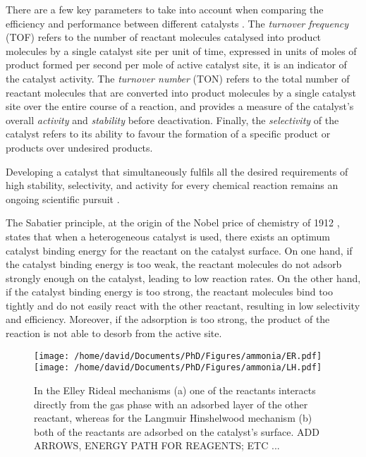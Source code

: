 There are a few key parameters to take into account when comparing the efficiency and performance between different catalysts \parencite{Boudart1995, ZHANG2019, WACHS2022}.
The \textit{turnover frequency} (TOF) refers to the number of reactant molecules catalysed into product molecules by a single catalyst site per unit of time, expressed in units of moles of product formed per second per mole of active catalyst site, it is an indicator of the catalyst activity.
The \textit{turnover number} (TON) refers to the total number of reactant molecules that are converted into product molecules by a single catalyst site over the entire course of a reaction, and provides a measure of the catalyst's overall \textit{activity} and \textit{stability} before deactivation.
Finally, the \textit{selectivity} of the catalyst refers to its ability to favour the formation of a specific product or products over undesired products.

Developing a catalyst that simultaneously fulfils all the desired requirements of high stability, selectivity, and activity for every chemical reaction remains an ongoing scientific pursuit \parencite{Hagen2016}.

The Sabatier principle, at the origin of the Nobel price of chemistry of 1912 \parencite{Che2013}, states that when a heterogeneous catalyst is used, there exists an optimum catalyst binding energy for the reactant on the catalyst surface.
On one hand, if the catalyst binding energy is too weak, the reactant molecules do not adsorb strongly enough on the catalyst, leading to low reaction rates.
On the other hand, if the catalyst binding energy is too strong, the reactant molecules bind too tightly and do not easily react with the other reactant, resulting in low selectivity and efficiency.
Moreover, if the adsorption is too strong, the product of the reaction is not able to desorb from the active site.

\begin{figure}[!htb]
    \centering
    \texttt{[image: /home/david/Documents/PhD/Figures/ammonia/ER.pdf]}
    \texttt{[image: /home/david/Documents/PhD/Figures/ammonia/LH.pdf]}
    \caption{
        In the Elley Rideal mechanisms (a) one of the reactants interacts directly from the gas phase with an adsorbed layer of the other reactant, whereas for the Langmuir Hinshelwood mechanism (b) both of the reactants are adsorbed on the catalyst's surface.
        \textcolor{Important}{ADD ARROWS, ENERGY PATH FOR REAGENTS; ETC ...}
    }
    \label{fig:Mechanisms}
\end{figure}

